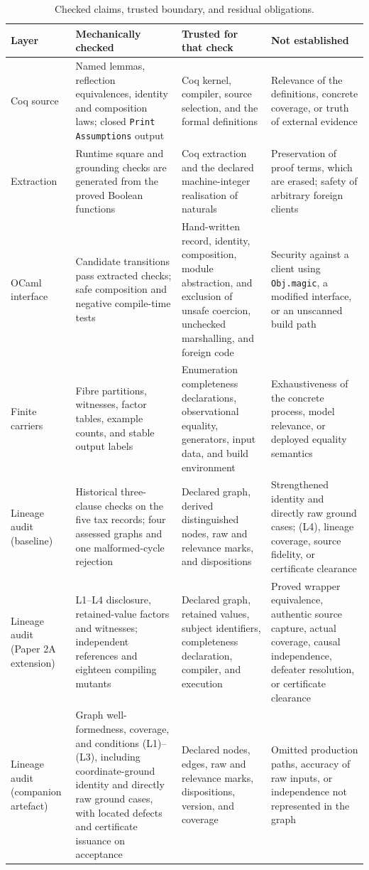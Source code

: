 \documentclass[11pt]{article}
\theoremstyle{definition}
\newcommand{\code}[1]{\texttt{#1}}
\begin{document}
\begin{table}[htbp]
\centering
\scriptsize
\caption{Checked claims, trusted boundary, and residual obligations.}
\label{ex:tab:trust-boundary}
\begin{tabularx}{\textwidth}{@{}p{2.1cm}LLL@{}}
\toprule
Layer & Mechanically checked & Trusted for that check & Not established \\
\midrule
Coq source & Named lemmas, reflection equivalences, identity and composition laws; closed \code{Print Assumptions} output & Coq kernel, compiler, source selection, and the formal definitions & Relevance of the definitions, concrete coverage, or truth of external evidence \\
Extraction & Runtime square and grounding checks are generated from the proved Boolean functions & Coq extraction and the declared machine-integer realisation of naturals & Preservation of proof terms, which are erased; safety of arbitrary foreign clients \\
OCaml interface & Candidate transitions pass extracted checks; safe composition and negative compile-time tests & Hand-written record, identity, composition, module abstraction, and exclusion of unsafe coercion, unchecked marshalling, and foreign code & Security against a client using \code{Obj.magic}, a modified interface, or an unscanned build path \\
Finite carriers & Fibre partitions, witnesses, factor tables, example counts, and stable output labels & Enumeration completeness declarations, observational equality, generators, input data, and build environment & Exhaustiveness of the concrete process, model relevance, or deployed equality semantics \\
Lineage audit (baseline) & Historical three-clause checks on the five tax records; four assessed graphs and one malformed-cycle rejection & Declared graph, derived distinguished nodes, raw and relevance marks, and dispositions & Strengthened identity and directly raw ground cases; (L4), lineage coverage, source fidelity, or certificate clearance \\
Lineage audit (Paper 2A extension) & L1--L4 disclosure, retained-value factors and witnesses; independent references and eighteen compiling mutants & Declared graph, retained values, subject identifiers, completeness declaration, compiler, and execution & Proved wrapper equivalence, authentic source capture, actual coverage, causal independence, defeater resolution, or certificate clearance \\
Lineage audit (companion artefact) & Graph well-formedness, coverage, and conditions (L1)--(L3), including coordinate-ground identity and directly raw ground cases, with located defects and certificate issuance on acceptance & Declared nodes, edges, raw and relevance marks, dispositions, version, and coverage & Omitted production paths, accuracy of raw inputs, or independence not represented in the graph \\

\end{tabularx}
\end{table}
\end{document}
